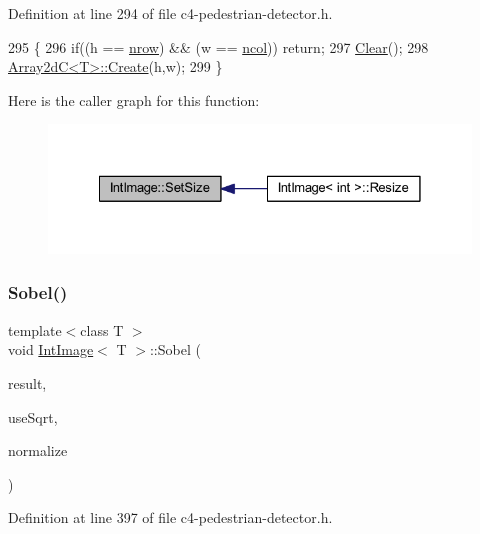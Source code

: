 Definition at line 294 of file c4-\/pedestrian-\/detector.\+h.


\begin{DoxyCode}
295 \{
296     \textcolor{keywordflow}{if}((h == \mbox{\hyperlink{class_array2d_c_a12f690f7195f7674a86a7e1eedbc473c}{nrow}}) && (w == \mbox{\hyperlink{class_array2d_c_a27e0f8f40f644831cd7c750db59dc28a}{ncol}})) \textcolor{keywordflow}{return};
297     \mbox{\hyperlink{class_int_image_a183a2bb5b576ab7a03010c0fff8f47cb}{Clear}}();
298     \mbox{\hyperlink{class_array2d_c_abfe87be7641dfc586b9e7bffebcca9ec}{Array2dC<T>::Create}}(h,w);
299 \}
\end{DoxyCode}
Here is the caller graph for this function\+:\nopagebreak
\begin{figure}[H]
\begin{center}
\leavevmode
\includegraphics[width=328pt]{class_int_image_a89eb8fac3fde8d3ce392e5f28c14f8b0_icgraph}
\end{center}
\end{figure}
\mbox{\label{class_int_image_a35b8a5c2e64fa3ab50d6b14973f368b8}} 
\subsubsection{\texorpdfstring{Sobel()}{Sobel()}}
{\footnotesize\ttfamily template$<$class T $>$ \\
void \mbox{\hyperlink{class_int_image}{Int\+Image}}$<$ T $>$\+::Sobel (\begin{DoxyParamCaption}\item[{\mbox{\hyperlink{class_int_image}{Int\+Image}}$<$ \mbox{\hyperlink{c4-pedestrian-detector_8h_a5821460e95a0800cf9f24c38915cbbde}{R\+E\+AL}} $>$ \&}]{result,  }\item[{const bool}]{use\+Sqrt,  }\item[{const bool}]{normalize }\end{DoxyParamCaption})}



Definition at line 397 of file c4-\/pedestrian-\/detector.\+h.


